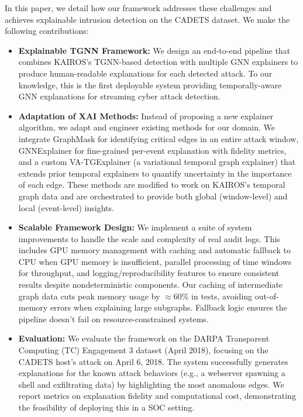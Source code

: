 \documentclass[conference]{IEEEtran}
\begin{document}
In this paper, we detail how our framework addresses these challenges and achieves explainable intrusion detection on the CADETS dataset. We make the following contributions:
\begin{itemize}
    \item \textbf{Explainable TGNN Framework:} We design an end-to-end pipeline that combines KAIROS's TGNN-based detection with multiple GNN explainers to produce human-readable explanations for each detected attack. To our knowledge, this is the first deployable system providing temporally-aware GNN explanations for streaming cyber attack detection.
    \item \textbf{Adaptation of XAI Methods:} Instead of proposing a new explainer algorithm, we adapt and engineer existing methods for our domain. We integrate GraphMask for identifying critical edges in an entire attack window, GNNExplainer \cite{b6} for fine-grained per-event explanation with fidelity metrics, and a custom VA-TGExplainer (a variational temporal graph explainer) that extends prior temporal explainers to quantify uncertainty in the importance of each edge. These methods are modified to work on KAIROS's temporal graph data and are orchestrated to provide both global (window-level) and local (event-level) insights.
    \item \textbf{Scalable Framework Design:} We implement a suite of system improvements to handle the scale and complexity of real audit logs. This includes GPU memory management with caching and automatic fallback to CPU when GPU memory is insufficient, parallel processing of time windows for throughput, and logging/reproducibility features to ensure consistent results despite nondeterministic components. Our caching of intermediate graph data cuts peak memory usage by $\approx$60\% in tests, avoiding out-of-memory errors when explaining large subgraphs. Fallback logic ensures the pipeline doesn't fail on resource-constrained systems.
    \item \textbf{Evaluation:} We evaluate the framework on the DARPA Transparent Computing (TC) Engagement 3 dataset \cite{b5} (April 2018), focusing on the CADETS host's attack on April 6, 2018. The system successfully generates explanations for the known attack behaviors (e.g., a webserver spawning a shell and exfiltrating data) by highlighting the most anomalous edges. We report metrics on explanation fidelity and computational cost, demonstrating the feasibility of deploying this in a SOC setting.
\end{itemize}
\end{document}
